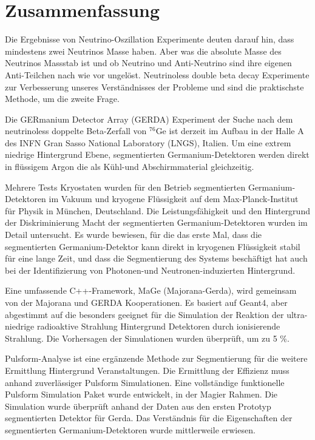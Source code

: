 \section*{Zusammenfassung}
Die Ergebnisse von Neutrino-Oszillation Experimente deuten darauf hin, dass mindestens zwei Neutrinos Masse haben. Aber was die absolute Masse des Neutrinos Massstab ist und ob Neutrino und Anti-Neutrino sind ihre eigenen Anti-Teilchen nach wie vor ungel\"ost. Neutrinoless double beta decay Experimente zur Verbesserung unseres Verst\"andnisses der Probleme und sind die praktischste Methode, um die zweite Frage.

Die GERmanium Detector Array (GERDA) Experiment der Suche nach dem neutrinoless doppelte Beta-Zerfall von $^{76}$Ge ist derzeit im Aufbau in der Halle A des INFN Gran Sasso National Laboratory (LNGS), Italien. Um eine extrem niedrige Hintergrund Ebene, segmentierten Germanium-Detektoren werden direkt in fl\"ussigem Argon die als K\"uhl-und Abschirmmaterial gleichzeitig.

Mehrere Tests Kryostaten wurden f\"ur den Betrieb segmentierten Germanium-Detektoren im Vakuum und kryogene Fl\"ussigkeit auf dem Max-Planck-Institut f\"ur Physik in M\"unchen, Deutschland. Die Leistungsf\"ahigkeit und den Hintergrund der Diskriminierung Macht der segmentierten Germanium-Detektoren wurden im Detail untersucht. Es wurde bewiesen, für die das erste Mal, dass die segmentierten Germanium-Detektor kann direkt in kryogenen Fl\"ussigkeit stabil f\"ur eine lange Zeit, und dass die Segmentierung des Systems besch\"aftigt hat auch bei der Identifizierung von Photonen-und Neutronen-induzierten Hintergrund.

Eine umfassende C++-Framework, MaGe (Majorana-Gerda), wird gemeinsam von der Majorana und GERDA Kooperationen. Es basiert auf Geant4, aber abgestimmt auf die besonders geeignet für die Simulation der Reaktion der ultra-niedrige radioaktive Strahlung Hintergrund Detektoren durch ionisierende Strahlung. Die Vorhersagen der Simulationen wurden \"uberpr\"uft, um zu 5 \%.

Pulsform-Analyse ist eine erg\"anzende Methode zur Segmentierung für die weitere Ermittlung Hintergrund Veranstaltungen. Die Ermittlung der Effizienz muss anhand zuverl\"assiger Pulsform Simulationen. Eine vollst\"andige funktionelle Pulsform Simulation Paket wurde entwickelt, in der Magier Rahmen. Die Simulation wurde \"uberpr\"uft anhand der Daten aus den ersten Prototyp segmentierten Detektor f\"ur Gerda. Das Verst\"andnis f\"ur die Eigenschaften der segmentierten Germanium-Detektoren wurde mittlerweile erwiesen.

\clearpage

